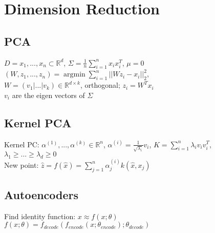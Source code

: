 \section*{Dimension Reduction}
\subsection*{PCA}
$D={x_1,...,x_n} \subset \mathbb{R}^d$,
$\Sigma = \frac{1}{n}\sum_{i=1}^n x_i x_i^T$, $\mu = 0$\\
$(W,z_1,...,z_n) = \operatorname{argmin} \sum_{i=1}^n||W z_i - x_i||_2^2$,\\
$W = (v_1|...|v_k) \in \mathbb{R}^{d \times k}$, orthogonal; $z_i = W^T x_i$ \\ 
$v_i$ are the eigen vectors of $\Sigma$

\subsection*{Kernel PCA}
Kernel PC: $\alpha^{(1)},...,\alpha^{(k)}\in \mathbb{R}^n$, $\alpha^{(i)} = \frac{1}{\sqrt{\lambda_i}}v_i$, $K = \sum_{i=1}^n \lambda_i v_i v_i^T$, $\lambda_1 \geq ... \geq \lambda_d \geq 0$\\
New point: $\hat{z} = f(\hat{x}) = \sum_{j=1}^n\alpha_j^{(i)}k(\hat{x},x_j)$

\subsection*{Autoencoders}
Find identity function: $x \approx f(x;\theta)$\\
$f(x;\theta) = f_{decode}(f_{encode}(x;\theta_{encode});\theta_{decode})$